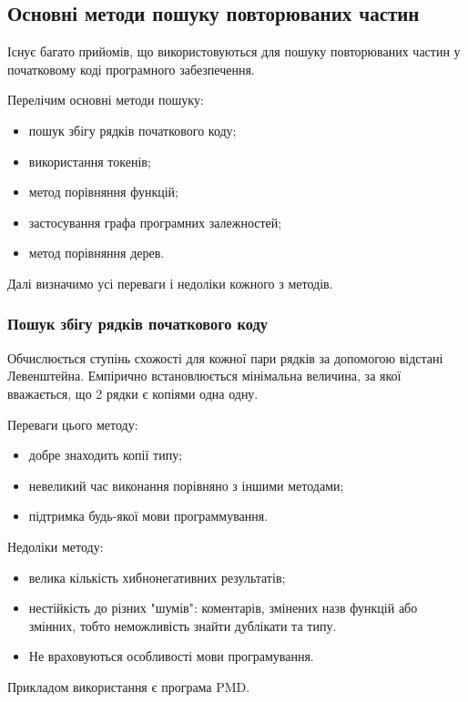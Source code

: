\documentclass[a4paper, 14pt]{article}
\newcommand{\RNum}[1]{\uppercase\expandafter{\romannumeral #1\relax}}
\begin{document}
\subsection{Основні методи пошуку повторюваних частин}
Існує багато прийомів, що використовуються для пошуку повторюваних частин у початковому коді програмного забезпечення.

Перелічим основні методи пошуку:
\begin{itemize}
	\item пошук збігу рядків початкового коду; 
	\item використання токенів;
	\item метод порівняння функцій;
	\item застосування графа програмних залежностей;
	\item метод порівняння дерев.
\end{itemize}
Далі визначимо усі переваги і недоліки кожного з методів.

\subsubsection{Пошук збігу рядків початкового коду}
Обчислюється ступінь схожості для кожної пари рядків за допомогою відстані Левенштейна. Емпірично встановлюється мінімальна величина, за якої вважається, що 2 рядки є копіями одна одну. 

Переваги цього методу:  
\begin{itemize}
\item добре знаходить копії \RNum{1} типу;
\item невеликий час виконання порівняно з іншими методами;
\item підтримка будь-якої мови программування.
\end{itemize}

Недоліки методу:
\begin{itemize}
\item велика кількість хибнонегативних результатів;
\item нестійкість до різних "шумів": коментарів, змінених назв функцій або змінних, тобто неможливість знайти дублікати \RNum{2} та \RNum{3} типу. 
\item Не враховуються особливості мови програмування.
\end{itemize}
Прикладом використання є програма PMD.
\end{document}
